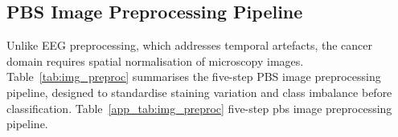 \subsection{PBS Image Preprocessing Pipeline}
\label{app:sec2_pbs_preproc}

Unlike EEG preprocessing, which addresses temporal artefacts, the cancer domain requires spatial normalisation of microscopy images. Table~\ref{tab:img_preproc} summarises the five-step PBS image preprocessing pipeline, designed to standardise staining variation and class imbalance before classification.
\noindent Table~\ref{app_tab:img_preproc} five-step pbs image preprocessing pipeline.

